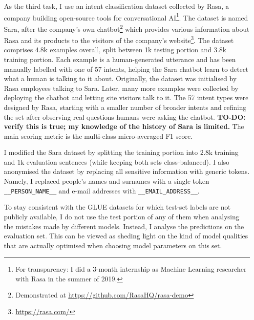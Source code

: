 \documentclass[bsc,frontabs,twoside,singlespacing,parskip,deptreport]{infthesis}
\begin{document}
{{    As the third task, I use an intent classification dataset collected by Rasa, a company building open-source tools for conversational AI\footnote{For transparency: I did a 3-month internship as Machine Learning researcher with Rasa in the summer of 2019.}. The dataset is named Sara, after the company's own chatbot\footnote{Demonstrated at \url{https://github.com/RasaHQ/rasa-demo}} which provides various information about Rasa and its products to the visitors of the company's website\footnote{\url{https://rasa.com/}}. The dataset comprises 4.8k examples overall, split between 1k testing portion and 3.8k training portion. Each example is a human-generated utterance and has been manually labelled with one of 57 intents, helping the Sara chatbot learn to detect what a human is talking to it about. Originally, the dataset was initialised by Rasa employees talking to Sara. Later, many more examples were collected by deploying the chatbot and letting site visitors talk to it. The 57 intent types were designed by Rasa, starting with a smaller number of broader intents and refining the set after observing real questions humans were asking the chatbot. \textbf{TO-DO: verify this is true; my knowledge of the history of Sara is limited.} The main scoring metric is the multi-class micro-averaged F1 score.

    I modified the Sara dataset by splitting the training portion into 2.8k training and 1k evaluation sentences (while keeping both sets class-balanced). I also anonymised the dataset by replacing all sensitive information with generic tokens. Namely, I replaced people's names and surnames with a single token \verb|__PERSON_NAME__| and e-mail addresses with \verb|__EMAIL_ADDRESS__|.

    To stay consistent with the GLUE datasets for which test-set labels are not publicly available, I do not use the test portion of any of them when analysing the mistakes made by different models. Instead, I analyse the predictions on the evaluation set. This can be viewed as sheding light on the kind of model qualities that are actually optimised when choosing model parameters on this set.
  }

}
\end{document}
